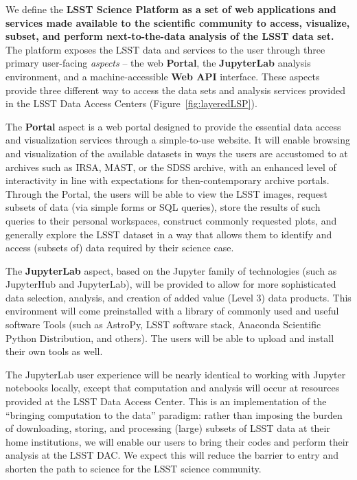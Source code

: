 \documentclass[DM,lsstdraft,toc]{lsstdoc}
\begin{document}
We define the {\bf LSST Science Platform as a set of web applications and services
made available to the scientific community to access, visualize, subset, and
perform next-to-the-data analysis of the LSST data set.}  The platform exposes the LSST data
and services to the user through three primary user-facing {\it aspects} -- the web {\bf Portal},
the {\bf JupyterLab} analysis environment, and a machine-accessible {\bf Web API} interface. These aspects provide three different way to access the data sets and analysis services provided in the LSST Data Access Centers (Figure~\ref{fig:layeredLSP}).

The {\bf Portal} aspect is a web portal designed to provide the essential data
access and visualization services through a simple-to-use website.  It will
enable browsing and visualization of the available datasets in ways the
users are accustomed to at archives such as IRSA, MAST, or the SDSS archive,
with an enhanced level of interactivity in line with expectations for
then-contemporary archive portals.  Through the Portal, the users will be
able to view the LSST images, request subsets of data (via simple forms or
SQL queries), store the results of such queries to their personal
workspaces, construct commonly requested plots, and generally explore the
LSST dataset in a way that allows them to identify and access (subsets of)
data required by their science case.

The {\bf JupyterLab} aspect, based on the Jupyter family of technologies (such as
JupyterHub and JupyterLab), will be provided to allow for more sophisticated
data selection, analysis, and creation of added value (Level 3) data
products.  This environment will come preinstalled with a library of
commonly used and useful software Tools (such as AstroPy, LSST software
stack, Anaconda Scientific Python Distribution, and others).  The users will
be able to upload and install their own tools as well.

The JupyterLab user experience will be nearly identical to working with
Jupyter notebooks locally, except that computation and analysis will occur
at resources provided at the LSST Data Access Center.  This is an
implementation of the “bringing computation to the data” paradigm: rather
than imposing the burden of downloading, storing, and processing (large)
subsets of LSST data at their home institutions, we will enable our users to
bring their codes and perform their analysis at the LSST DAC.  We expect
this will reduce the barrier to entry and shorten the path to science for
the LSST science community.
\end{document}
